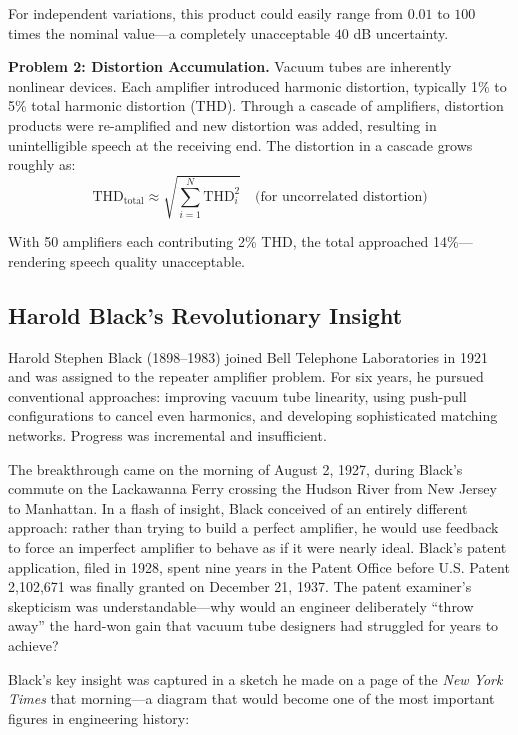 For independent variations, this product could easily range from $0.01$ to $100$ times the nominal value---a completely unacceptable $40$ dB uncertainty.

\textbf{Problem 2: Distortion Accumulation.} Vacuum tubes are inherently nonlinear devices. Each amplifier introduced harmonic distortion, typically 1\% to 5\% total harmonic distortion (THD). Through a cascade of amplifiers, distortion products were re-amplified and new distortion was added, resulting in unintelligible speech at the receiving end. The distortion in a cascade grows roughly as:
\begin{equation}
\text{THD}_{\text{total}} \approx \sqrt{\sum_{i=1}^{N} \text{THD}_i^2} \quad \text{(for uncorrelated distortion)}
\end{equation}

With 50 amplifiers each contributing 2\% THD, the total approached 14\%---rendering speech quality unacceptable.

\subsection{Harold Black's Revolutionary Insight}

\begin{historicalbox}
Harold Stephen Black (1898--1983) joined Bell Telephone Laboratories in 1921 and was assigned to the repeater amplifier problem. For six years, he pursued conventional approaches: improving vacuum tube linearity, using push-pull configurations to cancel even harmonics, and developing sophisticated matching networks. Progress was incremental and insufficient.

The breakthrough came on the morning of August 2, 1927, during Black's commute on the Lackawanna Ferry crossing the Hudson River from New Jersey to Manhattan. In a flash of insight, Black conceived of an entirely different approach: rather than trying to build a perfect amplifier, he would use feedback to force an imperfect amplifier to behave as if it were nearly ideal. Black's patent application, filed in 1928, spent nine years in the Patent Office before U.S. Patent 2,102,671 was finally granted on December 21, 1937. The patent examiner's skepticism was understandable---why would an engineer deliberately ``throw away'' the hard-won gain that vacuum tube designers had struggled for years to achieve?
\end{historicalbox}

Black's key insight was captured in a sketch he made on a page of the \textit{New York Times} that morning---a diagram that would become one of the most important figures in engineering history:

